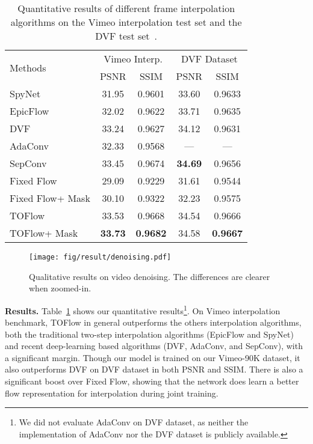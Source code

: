 \documentclass[twocolumn,natbib]{svjour3}          \smartqed  \usepackage{graphicx}
\newcommand{\tbl}[1]{Table~\ref{#1}}
\def\data{Vimeo-90K\xspace}
\def\model{TOFlow\xspace}
\def\fflow{Fixed Flow\xspace}
\def\epicflow{EpicFlow\xspace}
\def\interpbenchmark{Vimeo interpolation benchmark\xspace}
\newcommand{\myparagraph}[1]{\vspace{5pt}\noindent\textbf{#1}}
\begin{document}
\begin{table}[t]
\centering
\setlength{\tabcolsep}{5pt}
\begin{tabular}{lcccc}
    \toprule
    \multirow{2}{*}{Methods} & \multicolumn{2}{c}{Vimeo Interp.} & \multicolumn{2}{c}{DVF Dataset}\\
    \cmidrule(lr){2-3}\cmidrule(lr){4-5}
    & PSNR & SSIM & PSNR & SSIM \\
    \midrule
    SpyNet   & 31.95 & 0.9601 & 33.60 & 0.9633\\
    EpicFlow & 32.02 & 0.9622
                           & 33.71 & 0.9635\\
    DVF         & 33.24 & 0.9627 
                           & 34.12 & 0.9631\\
    AdaConv       & 32.33 & 0.9568
                           & --- & --- \\
    SepConv       & 33.45 & 0.9674
                           & \textbf{34.69} & 0.9656 \\
    \midrule
    \fflow & 29.09 & 0.9229
                        & 31.61 & 0.9544\\
    \fflow + Mask & 30.10 & 0.9322
                             & 32.23 & 0.9575\\
    \midrule
    \model          & 33.53 & 0.9668
                    & 34.54 & 0.9666 \\
    \model + Mask & \textbf{33.73} & \textbf{0.9682}
                & 34.58 & \textbf{0.9667} \\
    \bottomrule
\end{tabular}
\caption{Quantitative results of different frame interpolation algorithms on the Vimeo interpolation test set and the DVF test set~\citep{Liu2017Video}.}
\label{tbl:interp}

\end{table} \begin{figure*}[t]
    \centering
    \texttt{[image: fig/result/denoising.pdf]}
\caption{Qualitative results on video denoising. The differences are clearer when zoomed-in. 
    }
\label{fig:denoise}
\end{figure*}

 

\myparagraph{Results. }
\tbl{tbl:interp} shows our quantitative results\footnote{We did not evaluate AdaConv on DVF dataset, as neither the implementation of AdaConv nor the DVF dataset is publicly available.}. On \interpbenchmark, \model in general outperforms the others interpolation algorithms, both the traditional two-step interpolation algorithms (\epicflow and SpyNet) and recent deep-learning based algorithms (DVF, AdaConv, and SepConv), with a significant margin. Though our model is trained on our \data dataset, it also outperforms DVF on DVF dataset in both PSNR and SSIM. There is also a significant boost over \fflow, showing that the network does learn a better flow representation for interpolation during joint training.
\end{document}
